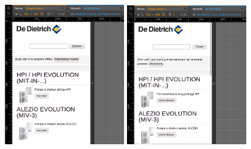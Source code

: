 \documentclass[a4paper,11pt,twoside]{report}
\begin{document}
\begin{description}
\begin{center}
	  \includegraphics[width=200]{images/DDTH_home_be_nl.png} 
	  \includegraphics[width=200]{images/DDTH_home_ru.png} 

\end{center}
\end{description}
\end{document}
